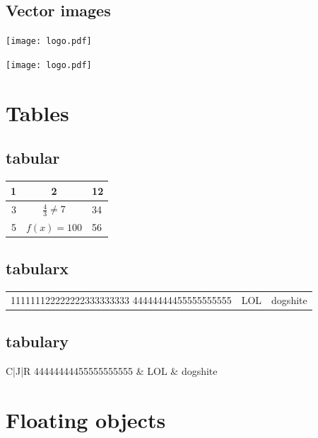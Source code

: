 \documentclass[a4paper,12pt]{article}
\begin{document}
\subsection{Vector images}

\texttt{[image: logo.pdf]}

\texttt{[image: logo.pdf]}

\section{Tables}

\subsection{tabular}

\setlength{\extrarowheight}{5mm}
\begin{tabular}{|rc||p{4cm}|}
  \hline 1 & 2 & 12 \\
  \hline 3 & $\displaystyle \frac{4}{3} \ne 7$ & 34 \\ [1cm]
  5 & $f(x)=100$ & 56
\end{tabular}
\setlength{\extrarowheight}{0mm}

\subsection{tabularx}

\begin{tabularx}{\textwidth}{X|c|X}
  \hline 111111122222222333333333 44444444455555555555 & LOL & dogshite
\end{tabularx}

\subsection{tabulary}

\begin{tabulary}{\textwidth}{C|J|R}
   44444444455555555555 & LOL & dogshite
\end{tabulary}


\section{Floating objects}
\end{document}
